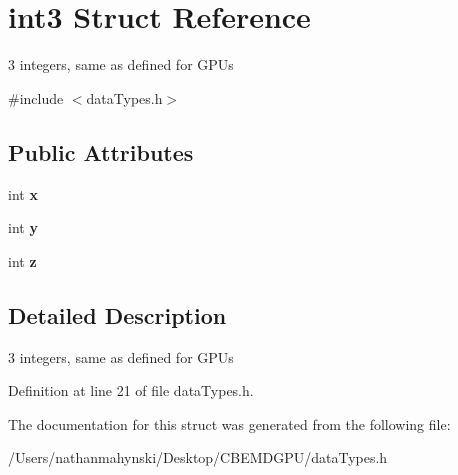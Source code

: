 \hypertarget{structint3}{\section{int3 Struct Reference}
\label{structint3}
}


3 integers, same as defined for G\-P\-Us  




{\ttfamily \#include $<$data\-Types.\-h$>$}

\subsection*{Public Attributes}
\begin{DoxyCompactItemize}
\item 
\hypertarget{structint3_a0a4ad50a155a35fa938ce6f16930affa}{int {\bfseries x}}\label{structint3_a0a4ad50a155a35fa938ce6f16930affa}

\item 
\hypertarget{structint3_a5d95e23491677d61019f0354b16adca9}{int {\bfseries y}}\label{structint3_a5d95e23491677d61019f0354b16adca9}

\item 
\hypertarget{structint3_a5cd5a3c388fa28814e3496ef07c39360}{int {\bfseries z}}\label{structint3_a5cd5a3c388fa28814e3496ef07c39360}

\end{DoxyCompactItemize}


\subsection{Detailed Description}
3 integers, same as defined for G\-P\-Us 

Definition at line 21 of file data\-Types.\-h.



The documentation for this struct was generated from the following file\-:\begin{DoxyCompactItemize}
\item 
/\-Users/nathanmahynski/\-Desktop/\-C\-B\-E\-M\-D\-G\-P\-U/data\-Types.\-h\end{DoxyCompactItemize}
